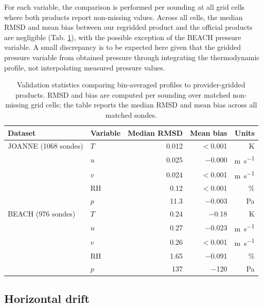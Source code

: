 \documentclass[11pt]{article}
\begin{document}
For each variable, the comparison is performed per sounding at all grid cells where both products report non-missing values.  Across all cells, the median RMSD and mean bias between our regridded product and the official products are negligible (Tab. \ref{tab:validation}), with the possible exception of the BEACH pressure variable. A small discrepancy is to be expected here given that the gridded pressure variable from \citet{gloeckner2025} obtained pressure through integrating the thermodynamic profile, not interpolating measured pressure values.

\begin{table}[h]
\centering
\caption{Validation statistics comparing bin-averaged profiles to provider-gridded products.  RMSD and bias are computed per sounding over matched non-missing grid cells; the table reports the median RMSD and mean bias across all matched sondes.}
\label{tab:validation}
\begin{tabular}{llrrr}
\toprule
Dataset & Variable & Median RMSD & Mean bias & Units \\
\midrule
JOANNE (1068 sondes) & $T$             & 0.012  & $<$0.001      & \si{K} \\
                      & $u$             & 0.025  & $-$0.000      & \si{m\per s} \\
                      & $v$             & 0.024  & $<$0.001      & \si{m\per s} \\
                      & $\mathrm{RH}$   & 0.12   & $<$0.001      & \% \\
                      & $p$             & 11.3   & $-$0.003      & \si{Pa} \\
\midrule
BEACH (976 sondes)    & $T$             & 0.24   & $-$0.18       & \si{K} \\
                      & $u$             & 0.27   & $-$0.023      & \si{m\per s} \\
                      & $v$             & 0.26   & $<$0.001      & \si{m\per s} \\
                      & $\mathrm{RH}$   & 1.65   & $-$0.091      & \% \\
                      & $p$             & 137    & $-$120        & \si{Pa} \\
\bottomrule
\end{tabular}
\end{table}

\subsection{Horizontal drift}
\end{document}
